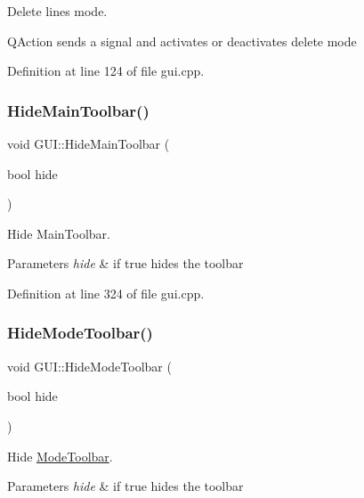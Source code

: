 Delete lines mode. 

Q\+Action sends a signal and activates or deactivates delete mode 

Definition at line 124 of file gui.\+cpp.

\mbox{\label{classGUI_aa115b0163bfbf518dd201f4f02476b75}} 
\subsubsection{\texorpdfstring{Hide\+Main\+Toolbar()}{HideMainToolbar()}}
{\footnotesize\ttfamily void G\+U\+I\+::\+Hide\+Main\+Toolbar (\begin{DoxyParamCaption}\item[{bool}]{hide }\end{DoxyParamCaption})}



Hide Main\+Toolbar. 


\begin{DoxyParams}{Parameters}
{\em hide} & if true hides the toolbar \\
\hline
\end{DoxyParams}


Definition at line 324 of file gui.\+cpp.

\mbox{\label{classGUI_a9517c0ad1e4c2b39faab8050f8133151}} 
\subsubsection{\texorpdfstring{Hide\+Mode\+Toolbar()}{HideModeToolbar()}}
{\footnotesize\ttfamily void G\+U\+I\+::\+Hide\+Mode\+Toolbar (\begin{DoxyParamCaption}\item[{bool}]{hide }\end{DoxyParamCaption})}



Hide \mbox{\hyperlink{structModeToolbar}{Mode\+Toolbar}}. 


\begin{DoxyParams}{Parameters}
{\em hide} & if true hides the toolbar \\
\hline
\end{DoxyParams}


